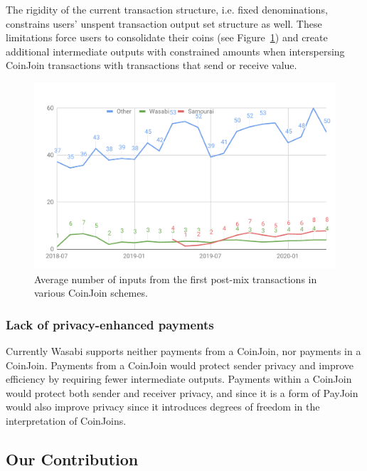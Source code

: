 \documentclass{article}
\begin{document}
The rigidity of the current transaction structure, i.e. fixed denominations, constrains users' unspent transaction output set structure as well. These limitations force users to consolidate their coins (see Figure~\ref{fig:postmixmerging}) and create additional intermediate outputs with constrained amounts when interspersing CoinJoin transactions with transactions that send or receive value.

\begin{figure}[h!]
    \centering
    \includegraphics[scale=0.4]{Figures/postMixInputMerging.pdf}
    \caption[]{Average number of inputs from the first post-mix transactions in various CoinJoin schemes.\footnotemark}
    \label{fig:postmixmerging}
\end{figure}


\subsubsection{Lack of privacy-enhanced payments} Currently Wasabi supports neither payments from a CoinJoin, nor payments in a CoinJoin. Payments from a CoinJoin would protect sender privacy and improve efficiency by requiring fewer intermediate outputs. Payments within a CoinJoin would protect both sender and receiver privacy, and since it is a form of PayJoin~\cite{payjoin} would also improve privacy since it introduces degrees of freedom in the interpretation of CoinJoins.

\subsection{Our Contribution}
\end{document}
